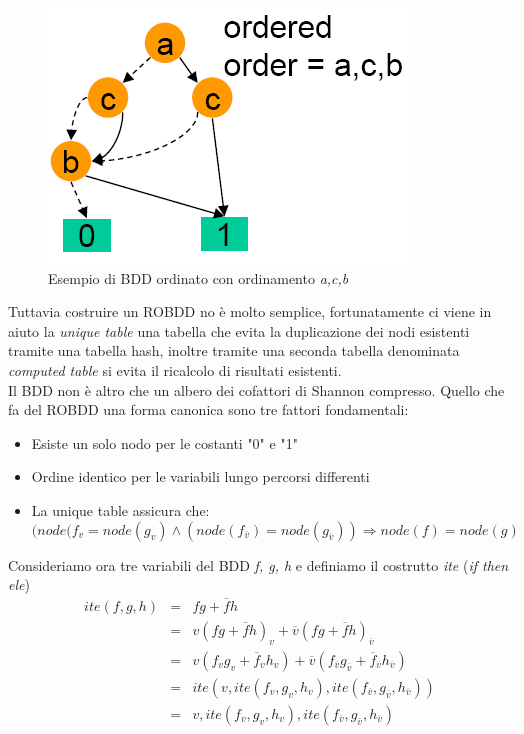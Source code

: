 \begin{figure}
\centering
\includegraphics[scale=0.5]{img/obdd.png}
\caption{Esempio di BDD ordinato con ordinamento \emph{a,c,b}}\label{fig:obdd}
\end{figure}
Tuttavia costruire un ROBDD no è molto semplice, fortunatamente ci viene in aiuto la \emph{unique table} una tabella che evita la duplicazione dei nodi esistenti tramite una tabella hash, inoltre tramite una seconda tabella denominata \emph{computed table} si evita il ricalcolo di risultati esistenti.\\
Il BDD non è altro che un albero dei cofattori di Shannon compresso. Quello che fa del ROBDD una forma canonica sono tre fattori fondamentali:
\begin{itemize}
\item Esiste un solo nodo per le costanti "0" e "1"
\item Ordine identico per le variabili lungo percorsi differenti
\item La unique table assicura che:
$$(node(f_{v}=node(g_{v})\wedge (node(f_{\overline{v}})=node(g_{\overline{v}})) \Rightarrow node(f)=node(g)$$
\end{itemize}
Consideriamo ora tre variabili del BDD \emph{f, g, h} e definiamo il costrutto \emph{ite} (\emph{if then ele})
$$
\begin{array}{rcl}
ite(f,g,h) & = & fg+\overline{f}h\\
& = & v(fg+\overline{f}h)_{v}+\overline{v}(fg+\overline{f}h)_{\overline{v}}\\
& = & v(f_{v}g_{v}+\overline{f}_{v}h_{v})+\overline{v}(f_{\overline{v}}g_{\overline{v}}+\overline{f}_{\overline{v}}h_{\overline{v}})\\
& = & ite (v,ite(f_v,g_v,h_v),ite(f_{\overline{v}},g_{\overline{v}},h_{\overline{v}}))\\
& = & v,ite(f_v,g_v,h_v),ite(f_{\overline{v}},g_{\overline{v}},h_{\overline{v}})
\end{array}
$$
